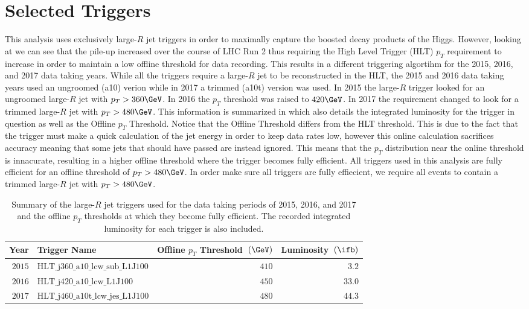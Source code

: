 \section{Selected Triggers} \label{sec:selection:triggers}

This analysis uses exclusively large-$R$ jet triggers in order to maximally
capture the boosted decay products of the Higgs.  However, looking at
 we can see that the pile-up increased over the course of LHC
Run 2 thus requiring the High Level Trigger (HLT) $p_{T}$ requirement to
increase in order to maintain a low offline threshold for data recording.  This
results in a different triggering algortihm for the 2015, 2016, and 2017 data
taking years.  While all the triggers require a large-$R$ jet to be
reconstructed in the HLT, the 2015 and 2016 data taking years used an ungroomed
(a10) verion while in 2017 a trimmed (a10t) version was used.  In 2015 the
large-$R$ trigger looked for an ungroomed large-$R$ jet with $p_{T} > 360\GeV$.
In 2016 the $p_{T}$ threshold was raised to $420\GeV$.  In 2017 the requirement
changed to look for a trimmed large-$R$ jet with $p_{T} > 480\GeV$.  This
information is summarized in  which also details the integrated
luminosity for the trigger in question as well as the Offline $p_{T}$
Threshold.  Notice that the Offline Threshold differs from the HLT threshold.
This is due to the fact that the trigger must make a quick calculation of the
jet energy in order to keep data rates low, however this online calculation
sacrifices accuracy meaning that some jets that should have passed are instead
ignored.  This means that the $p_{T}$ distribution near the online threshold is
innacurate, resulting in a higher offline threshold where the trigger becomes
fully efficient.  All triggers used in this analysis are fully efficient for
an offline threshold of $p_{T} > 480\GeV$.  In order make sure all triggers are
fully effiecient, we require all events to contain a trimmed large-$R$ jet with
$p_{T} > 480\GeV$.

\begin{table}[htpb]
 \centering 
  \caption{ Summary of the large-$R$ jet triggers used for the data taking
periods of 2015, 2016, and 2017 and the offline $p_{T}$ thresholds at which
they become fully efficient. The recorded integrated luminosity for each
trigger is also included.}
 \begin{tabular}{@{}rlrr@{}}
  \toprule
  Year   & Trigger Name                 & Offline $p_{T}$ Threshold~$(\GeV)$ & Luminosity~$\left(\ifb\right)$ \\ \midrule
  $2015$ & $\text{HLT\_j360\_a10\_lcw\_sub\_L1J100}$  & $410$                              & $3.2$                          \\
  $2016$ & $\text{HLT\_j420\_a10\_lcw\_L1J100}$      & $450$                              & $33.0$                         \\
  $2017$ & $\text{HLT\_j460\_a10t\_lcw\_jes\_L1J100}$ & $480$                              & $44.3$                         \\
  \bottomrule
 \end{tabular}
 \label{table:triggers}
\end{table}
